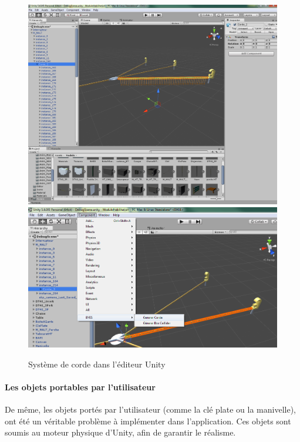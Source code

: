\documentclass[a4paper]{article}
\begin{document}
    \begin{figure}[H]
        \centering
        \includegraphics[scale=0.3]{img/CordeUnity}
        \includegraphics[scale=0.4]{img/GenererCorde}
        \caption{Système de corde dans l'éditeur Unity}
    \end{figure}

    \paragraph{Les objets portables par l'utilisateur}

    De même, les objets portés par l'utilisateur (comme la clé plate ou la manivelle), ont été un véritable problème à implémenter dans l'application. Ces objets sont soumis au moteur physique d'Unity, afin de garantir le réalisme. \\
\end{document}
